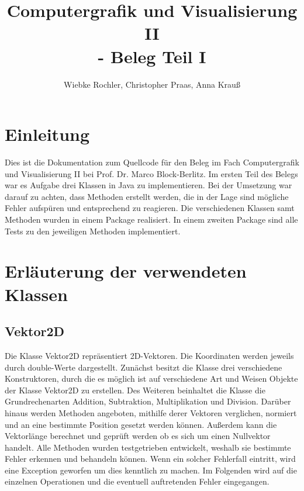 \documentclass[a4paper,11pt]{scrartcl}
\title{Computergrafik und Visualisierung II \\- Beleg Teil I}
\author{Wiebke Rochler, Christopher Praas, Anna Krauß}
\begin{document}
\maketitle
\tableofcontents
\newpage
\section{Einleitung}
Dies ist die Dokumentation zum Quellcode für den Beleg im Fach Computergrafik und Visualisierung II bei Prof. Dr. Marco Block-Berlitz. Im ersten Teil des Belegs war es Aufgabe drei Klassen in Java zu implementieren. Bei der Umsetzung war darauf zu achten, dass Methoden erstellt werden, die in der Lage sind mögliche Fehler aufspüren und entsprechend zu reagieren.
Die verschiedenen Klassen samt Methoden wurden in einem Package realisiert. In einem zweiten Package sind alle Tests zu den jeweiligen Methoden implementiert.
\newpage
\section{Erläuterung der verwendeten Klassen}
\subsection{Vektor2D}
Die Klasse Vektor2D repräsentiert 2D-Vektoren. Die Koordinaten werden jeweils durch double-Werte dargestellt. Zunächst besitzt die Klasse drei verschiedene Konstruktoren, durch die es möglich ist auf verschiedene Art und Weisen Objekte der Klasse Vektor2D zu erstellen. Des Weiteren beinhaltet die Klasse die Grundrechenarten Addition, Subtraktion, Multiplikation und Division. Darüber hinaus werden Methoden angeboten, mithilfe derer Vektoren verglichen, normiert und an eine bestimmte Position gesetzt werden können. Außerdem kann die Vektorlänge berechnet und geprüft werden ob es sich um einen Nullvektor handelt. Alle Methoden wurden testgetrieben entwickelt, weshalb sie bestimmte Fehler erkennen und behandeln können. Wenn ein solcher Fehlerfall eintritt, wird eine Exception geworfen um dies kenntlich zu machen. Im Folgenden wird auf die einzelnen Operationen und die eventuell auftretenden Fehler eingegangen.
\end{document}
